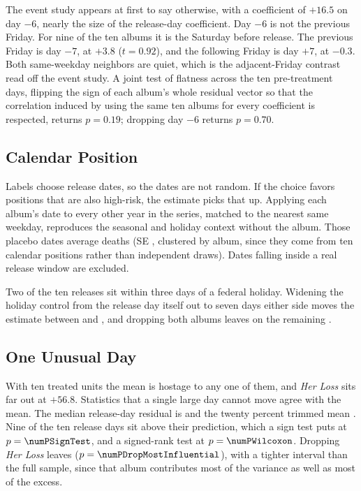 \documentclass[11pt]{article}
\begin{document}


The event study appears at first to say otherwise, with a coefficient of $+16.5$ on day $-6$,
nearly the size of the release-day coefficient. Day $-6$ is not the previous Friday. For nine of
the ten albums it is the Saturday before release. The previous Friday is day $-7$, at $+3.8$
($t = 0.92$), and the following Friday is day $+7$, at $-0.3$. Both same-weekday neighbors are
quiet, which is the adjacent-Friday contrast read off the event study. A joint test of flatness
across the ten pre-treatment days, flipping the sign of each album's whole residual vector so that
the correlation induced by using the same ten albums for every coefficient is respected, returns
$p = 0.19$; dropping day $-6$ returns $p = 0.70$.

\subsection{Calendar Position}

Labels choose release dates, so the dates are not random. If the choice favors positions that are
also high-risk, the estimate picks that up. Applying each album's date to every other year in the
series, matched to the nearest same weekday, reproduces the seasonal and holiday context without
the album. Those \numNCalendarPlacebo{} placebo dates average \numEffectCalendarPlacebo{} deaths
(SE \numSECalendarPlacebo{}, clustered by album, since they come from ten calendar positions
rather than \numNCalendarPlacebo{} independent draws). Dates falling inside a real release window
are excluded.

Two of the ten releases sit within three days of a federal holiday. Widening the holiday control
from the release day itself out to seven days either side moves the estimate between
\numEffectHolAdjMin{} and \numEffectHolAdjMax{}, and dropping both albums leaves
\numEffectDropHolAdj{} on the remaining \numNDropHolAdj{}.

\subsection{One Unusual Day}

With ten treated units the mean is hostage to any one of them, and \emph{Her Loss} sits far out at
$+56.8$. Statistics that a single large day cannot move agree with the mean. The median release-day
residual is \numMedianEffect{} and the twenty percent trimmed mean \numTrimmedEffect{}. Nine of the
ten release days sit above their prediction, which a sign test puts at $p = \numPSignTest$, and a
signed-rank test at $p = \numPWilcoxon$. Dropping \emph{Her Loss} leaves
\numEffectDropMostInfluential{} ($p = \numPDropMostInfluential$), with a tighter interval than the
full sample, since that album contributes most of the variance as well as most of the excess.
\end{document}
